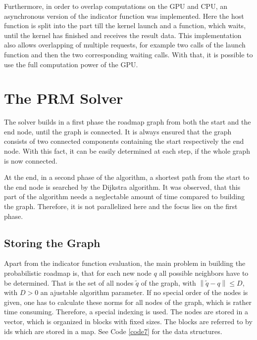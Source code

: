 \documentclass[twocolumn]{svjour3}
\newcommand{\norm}[1]{\left\lVert#1\right\rVert}
\begin{document}
Furthermore, in order to overlap computations on the GPU and CPU, an asynchronous version of the indicator function was implemented. 
Here the host function is split into the part till the kernel launch and a function, which waits, until the kernel has finished and receives the result data.
This implementation also allows overlapping of multiple requests, for example two calls of the launch function and then the two corresponding waiting calls. 
With that, it is possible to use the full computation power of the GPU.




\section{The PRM Solver}\label{solver}

The solver builds in a first phase the roadmap graph from both the start and the end node, until the graph is connected.
It is always ensured that the graph consists of two connected components containing the start respectively the end node.
With this fact, it can be easily determined at each step, if the whole graph is now connected.

At the end, in a second phase of the algorithm, a shortest path from the start to the end node is searched by the Dijkstra algorithm.
It was observed, that this part of the algorithm needs a neglectable amount of time compared to building the graph.
Therefore, it is not parallelized here and the focus lies on the first phase.

\subsection{Storing the Graph}

Apart from the indicator function evaluation, the main problem in building the probabilistic roadmap is, 
that for each new node $q$ all possible neighbors have to be determined.
That is the set of all nodes $\tilde q$ of the graph, with $\norm{\tilde q - q} \le D$, with $D>0$ an ajustable algorithm parameter.
If no special order of the nodes is given, one has to calculate these norms for all nodes of the graph, which is rather time consuming.
Therefore, a special indexing is used. 
The nodes are stored in a vector, which is organized in blocks with fixed sizes. The blocks are referred to by ids which are stored in a map. See Code \ref{code7} for the data structures.
\end{document}
